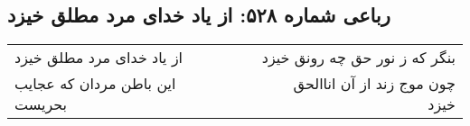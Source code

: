 \begin{center}
\section*{رباعی شماره ۵۲۸: از یاد خدای مرد مطلق خیزد}
\label{sec:0528}
\begin{longtable}{l p{0.5cm} r}
از یاد خدای مرد مطلق خیزد
&&
بنگر که ز نور حق چه رونق خیزد
\\
این باطن مردان که عجایب بحریست
&&
چون موج زند از آن اناالحق خیزد
\\
\end{longtable}
\end{center}
